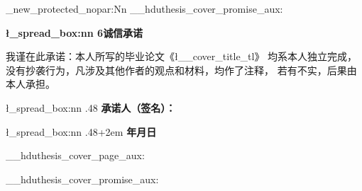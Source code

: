\cs_new_protected_nopar:Nn \__hduthesis_cover_promise_aux:
  {
    \vspace*{3.75\baselineskip}
    \begin{center}
      \@beginparpenalty\@lowpenalty
      \Large\textsf{\bfseries \l_spread_box:nn {6\ccwd}{诚信承诺}}
      \@endparpenalty\@M
    \end{center}
    \vspace*{.6\baselineskip}\par
    \linespread{1.9}
      {
        \large
        我谨在此承诺：本人所写的毕业论文《\l__cover_title_tl》
        均系本人独立完成，没有抄袭行为，凡涉及其他作者的观点和材料，均作了注释，
        若有不实，后果由本人承担。\par\vspace*{1.1\baselineskip}
        \l_spread_box:nn {.48\linewidth}{}
          \textsf{\bfseries 承诺人（签名）：}
        \vspace*{.4\baselineskip}\par
        \l_spread_box:nn {.48\linewidth+2em}{}
          \textsf{\bfseries 年\qquad 月\qquad 日}
      }
  }

\RenewDocumentCommand \maketitle {}
  {
    \begin{titlepage}
      \__hduthesis_cover_page_aux:
    \end{titlepage}
    \titlepage
      \__hduthesis_cover_promise_aux:
    \endtitlepage
  }
\endinput